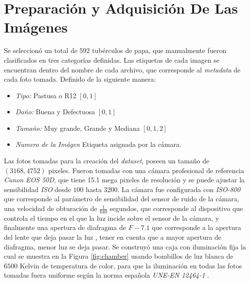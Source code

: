 \section{Preparación y Adquisición De Las Imágenes}

Se seleccionó un total de $592$ tubérculos de papa, que manualmente fueron clasificados en tres categorías definidas. Las etiquetas de cada imagen se encuentran dentro del nombre de cada archivo, que corresponde al \textit{metadata} de cada foto tomada. Definido de la siguiente manera:

\begin{itemize}
	\item \textit{Tipo:} Pastusa o R12 $[0,1]$
	\item \textit{Daño:} Buena y Defectuosa $[0,1]$
	\item \textit{Tamaño:} Muy grande, Grande y Mediana $[0,1,2]$
	\item \textit{Numero de la Imágen} Etiqueta asignada por la cámara.
\end{itemize}	

Las fotos tomadas para la creación del \textit{dataset}, poseen un tamaño de $(3168, 4752)$ pixeles. Fueron tomadas con una cámara profesional de referencia \textit{Canon EOS 50D}, que tiene 15.1 mega pixeles de resolución y se puede ajustar la sensibilidad \textit{ISO} desde $100$ hasta $3200$. La cámara fue configurada con \textit{ISO-800} que corresponde al parámetro de sensibilidad del sensor de ruido de la cámara, una velocidad de obturación de $\frac{1}{640}$ segundos, que corresponde al dispositivo que controla el tiempo en el que la luz incide sobre el sensor de la cámara, y finalmente una apertura de diafragma de $F-7.1$ que corresponde a la apertura del lente que deja pasar la luz \cite{Camara}, tener en cuenta que a mayor apertura de diafragma, menor luz se deja pasar. Se construyó una caja con iluminación fija la cual se muestra en la Figura \ref{fig:chamber} usando bombillos de luz blanca de $6500$ Kelvin de temperatura de color, para que la iluminación en todas las fotos tomadas fuera uniforme según la norma española \textit{UNE-EN 12464-1} \cite{normaespanola}.

